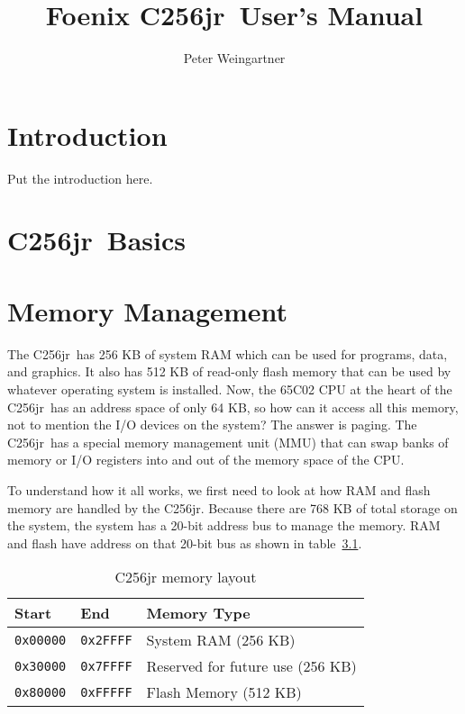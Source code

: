 \documentclass[oneside]{book}
\newcommand{\junior}{{\sc C256jr}}
\begin{document}
\title{Foenix \junior\ User's Manual}
\author{Peter Weingartner}
\maketitle

\chapter{Introduction}

Put the introduction here.

\chapter{\junior\ Basics}

\chapter{Memory Management}

The \junior\ has 256 KB of system RAM which can be used for programs, data, and graphics. It also has 512 KB of read-only flash memory that can be used by whatever operating system is installed. Now, the 65C02 CPU at the heart of the \junior\ has an address space of only 64 KB, so how can it access all this memory, not to mention the I/O devices on the system? The answer is paging. The \junior\ has a special memory management unit (MMU) that can swap banks of memory or I/O registers into and out of the memory space of the CPU.

To understand how it all works, we first need to look at how RAM and flash memory are handled by the \junior. Because there are 768 KB of total storage on the system, the system has a 20-bit address bus to manage the memory. RAM and flash have address on that 20-bit bus as shown in table~\ref{tab:memory}.

\begin{table}
	\begin{center}
		\begin{tabular}{| l | l | l |} \hline
			Start & End & Memory Type \\ \hline\hline
		  	{\tt 0x00000} & {\tt 0x2FFFF} & System RAM (256 KB)\\ \hline
			{\tt 0x30000} & {\tt 0x7FFFF} & Reserved for future use (256 KB)\\ \hline
		  	{\tt 0x80000} & {\tt 0xFFFFF} & Flash Memory (512 KB) \\ \hline
		\end{tabular}
	\end{center}
	\caption{C256jr memory layout}
	\label{tab:memory}
\end{table}
\end{document}
